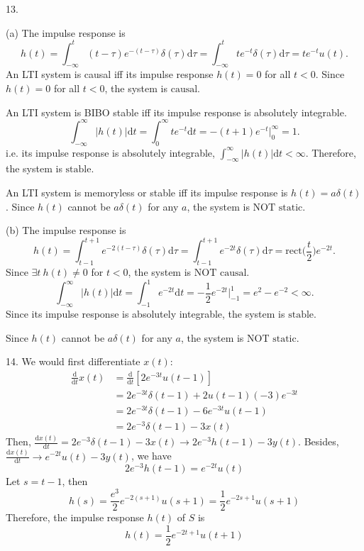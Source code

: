\documentclass[a4paper]{article}
\begin{document}
13.

(a) The impulse response is
$$h(t)=\int_{-\infty}^t(t-\tau)e^{-(t-\tau)}\delta(\tau)\mathrm{d}\tau=\int_{-\infty}^tte^{-t}\delta(\tau)\mathrm{d}\tau=te^{-t}u(t).$$
An LTI system is causal iff its impulse response $h(t)=0$ for all $t<0$. Since $h(t)=0$ for all $t<0$, the system is $\boxed{\text{causal}}$.

An LTI system is BIBO stable iff its impulse response is absolutely integrable.
$$\int_{-\infty}^\infty|h(t)|\mathrm{d}t=\int_0^\infty te^{-t}\mathrm{d}t=-(t+1)e^{-t}\bigg|_0^\infty=1.$$
i.e. its impulse response is absolutely integrable, $\int_{-\infty}^\infty|h(t)|\mathrm{d}t<\infty$. Therefore, the system is $\boxed{\text{stable}}$.

An LTI system is memoryless or stable iff its impulse response is $h(t)=a\delta(t)$. Since $h(t)$ cannot be $a\delta(t)$ for any $a$, the system is $\boxed{\text{NOT static}}$.%

(b) The impulse response is
$$h(t)=\int_{t-1}^{t+1}e^{-2(t-\tau)}\delta(\tau)\mathrm{d}\tau=\int_{t-1}^{t+1}e^{-2t}\delta(\tau)\mathrm{d}\tau=\mathrm{rect}\bigg(\frac{t}{2}\bigg)e^{-2t}.$$
Since $\exists t\ h(t)\neq0$ for $t<0$, the system is $\boxed{\text{NOT causal}}$.
$$\int_{-\infty}^\infty|h(t)|\mathrm{d}t=\int_{-1}^1e^{-2t}\mathrm{d}t=-\frac{1}{2}e^{-2t}\bigg|_{-1}^1=e^2-e^{-2}<\infty.$$
Since its impulse response is absolutely integrable, the system is $\boxed{\text{stable}}$.

Since $h(t)$ cannot be $a\delta(t)$ for any $a$, the system is $\boxed{\text{NOT static}}$.

14. We would first differentiate $x(t)$:
\begin{align*}
    \frac{\mathrm{d}}{\mathrm{d}t}x(t)&=\frac{\mathrm{d}}{\mathrm{d}t}[2e^{-3t}u(t-1)]\\
    &=2e^{-3t}\delta(t-1)+2u(t-1)(-3)e^{-3t}\\
    &=2e^{-3t}\delta(t-1)-6e^{-3t}u(t-1)\\
    &=2e^{-3}\delta(t-1)-3x(t)
\end{align*}
Then, $\frac{\mathrm{d}x(t)}{\mathrm{d}t}=2e^{-3}\delta(t-1)-3x(t)\rightarrow2e^{-3}h(t-1)-3y(t)$. Besides, $\frac{\mathrm{d}x(t)}{\mathrm{d}t}\rightarrow e^{-2t}u(t)-3y(t)$, we have
$$2e^{-3}h(t-1)=e^{-2t}u(t)$$
Let $s=t-1$, then
$$h(s)=\frac{e^3}{2}e^{-2(s+1)}u(s+1)=\frac{1}{2}e^{-2s+1}u(s+1)$$
Therefore, the impulse response $h(t)$ of $S$ is
$$\boxed{h(t)=\frac{1}{2}e^{-2t+1}u(t+1)}$$
\end{document}
